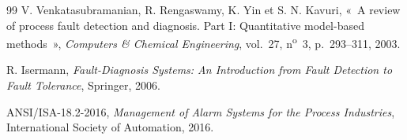 \begin{thebibliography}{99}
 V. Venkatasubramanian, R. Rengaswamy, K. Yin et S. N. Kavuri, «~A review of process fault detection and diagnosis. Part I: Quantitative model-based methods~», \textit{Computers \& Chemical Engineering}, vol.~27, n\textsuperscript{o}~3, p.~293--311, 2003.

 R. Isermann, \textit{Fault-Diagnosis Systems: An Introduction from Fault Detection to Fault Tolerance}, Springer, 2006.

 ANSI/ISA-18.2-2016, \textit{Management of Alarm Systems for the Process Industries}, International Society of Automation, 2016.

\end{thebibliography}
